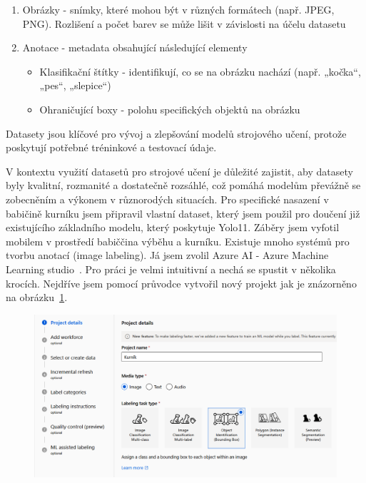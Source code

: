 \begin{enumerate}
    \item Obrázky - snímky, které mohou být v různých formátech (např. JPEG, PNG). Rozlišení a počet barev se může lišit v závislosti na účelu datasetu
    \item Anotace - metadata obsahující následující elementy
    \begin{itemize}
        \item Klasifikační štítky - identifikují, co se na obrázku nachází (např. „kočka“, „pes“, „slepice“)
        \item Ohraničující boxy - polohu specifických objektů na obrázku
    \end{itemize}
\end{enumerate}

Datasety jsou klíčové pro vývoj a zlepšování modelů strojového učení, protože poskytují potřebné tréninkové a testovací údaje.

V kontextu využití datasetů pro strojové učení je důležité zajistit, aby datasety byly kvalitní, rozmanité a dostatečně rozsáhlé, což pomáhá modelům převážně se zobecněním a výkonem v různorodých situacích.
Pro specifické nasazení v babičině kurníku jsem připravil vlastní dataset, který jsem použil pro doučení již existujícího základního modelu, který poskytuje Yolo11.
Záběry jsem vyfotil mobilem v prostředí babiččina výběhu a kurníku.
Existuje mnoho systémů pro tvorbu anotací (image labeling).
Já jsem zvolil Azure AI - Azure Machine Learning studio~\cite{aml}.
Pro práci je velmi intuitivní a nechá se spustit v několika krocích.
Nejdříve jsem pomocí průvodce vytvořil nový projekt jak je znázorněno na obrázku~\ref{fig:create_learning_project}.

\begin{figure}[htbp]
    \centering
    \includegraphics[width=1.0\textwidth]{img/create_learning_project}
    \label{fig:create_learning_project}
\end{figure}


